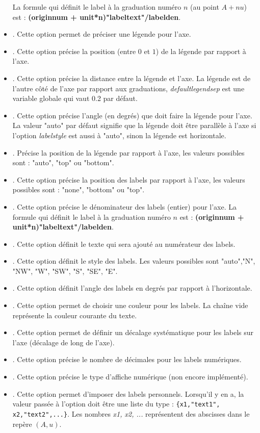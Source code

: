 \begin{itemize}
    La formule qui définit le label à la graduation numéro $n$ (au point $A+nu$) est : \textbf{(originnum + unit*n)"labeltext"/labelden}.

    \item {}. Cette option permet de préciser une légende pour l'axe.
    \item {}. Cette option précise la position (entre $0$ et $1$) de la légende par rapport à l'axe.
    \item {}. Cette option précise la distance entre la légende et l'axe. La légende est de l'autre côté de l'axe par rapport aux graduations, \emph{defaultlegendsep} est une variable globale qui vaut 0.2 par défaut.
    \item {}. Cette option précise l'angle (en degrés) que doit faire la légende pour l'axe. La valeur "auto" par défaut signifie que la légende doit être parallèle à l'axe si l'option \emph{labelstyle} est aussi à "auto", sinon la légende est horizontale.
    \item {}. Précise la position de la légende par rapport à l'axe, les valeurs possibles sont : "auto", "top" ou "bottom".
    \item {}. Cette option précise la position des labels par rapport à l'axe, les valeurs possibles sont : "none", "bottom" ou "top".
    \item {}. Cette option précise le dénominateur des labels (entier) pour l'axe. La formule qui définit le label à la graduation numéro $n$ est : \textbf{(originnum + unit*n)"labeltext"/labelden}.
    \item {}. Cette option définit le texte qui sera ajouté au numérateur des labels.
    \item {}. Cette option définit le style des labels. Les valeurs possibles sont "auto","N", "NW", "W", "SW", "S", "SE", "E".
    \item {}. Cette option définit l'angle des labels en degrés par rapport à l'horizontale.
    \item {}. Cette option permet de choisir une couleur pour les labels. La chaîne vide représente la couleur courante du texte.
    \item {}. Cette option permet de définir un décalage systématique pour les labels sur l'axe (décalage de long de l'axe).
    \item {}. Cette option précise le nombre de décimales pour les labels numériques.
    \item {}. Cette option précise le type d'affiche numérique (non encore implémenté).
    \item {}. Cette option permet d'imposer des labels personnels. Lorsqu'il y en a, la valeur passée à l'option doit être une liste du type : \verb|{x1,"text1", x2,"text2",...}|. Les nombres \emph{x1, x2, ...} représentent des abscisses dans le repère $(A,u)$.
\end{itemize}

